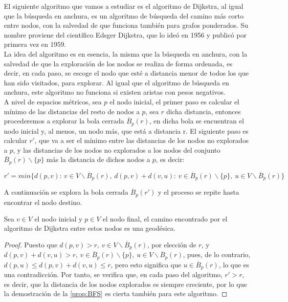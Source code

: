 El siguiente algoritmo que vamos a estudiar es el algoritmo de Dijkstra, al igual que la búsqueda en anchura, es un algoritmo de búsqueda del camino más corto entre nodos, con la salvedad de que funciona también para grafos ponderados. Su nombre proviene del científico Edsger Dijkstra, que lo ideó en 1956 y publicó por primera vez en 1959. \\

La idea del algoritmo es en esencia, la misma que la búsqueda en anchura, con la salvedad de que la exploración de los nodos se realiza de forma ordenada, es decir, en cada paso, se escoge el nodo que esté a distancia menor de todos los que han sido visitados, para explorar. Al igual que el algoritmo de búsqueda en anchura, este algoritmo no funciona si existen aristas con pesos negativos. \\

A nivel de espacios métricos, sea $p$ el nodo inicial, el primer paso es calcular el mínimo de las distancias del resto de nodos a $p$, sea $r$ dicha distancia, entonces procederemos a explorar la bola cerrada $\overline B_p(r)$, en dicha bola se encuentran el nodo inicial y, al menos, un nodo más, que está a distancia r. El siguiente paso es calcular $r'$, que va a ser el mínimo entre las distancias de los nodos no explorados a $p$, y las distancias de los nodos no explorados a los nodos del conjunto $\overline B_p(r)\backslash\{p\}$ más la distancia de dichos nodos a $p$, es decir:

$$r' = min\{d(p,v):\ v \in V\backslash\overline B_p(r),\ d(p,v) + d(v,u):\ v \in \overline B_p(r)\backslash\{p\},\ u \in V\backslash\overline B_p(r)\}$$

A continuación se explora la bola cerrada $\overline B_p(r')$ y el proceso se repite hasta encontrar el nodo destino.

\begin{proposicion}\label{prop:DJK}
	Sea $v \in V$ el nodo inicial y $p \in V$ el nodo final, el camino encontrado por el algoritmo de Dijkstra entre estos nodos es una geodésica.
\end{proposicion}

\begin{proof}
	Puesto que $d(p,v) > r,\ v \in V\backslash\overline B_p(r)$, por elección de $r$, y $d(p,v) + d(v,u) > r,\ v \in \overline B_p(r)\backslash\{p\},\ u \in V\backslash\overline B_p(r)$, pues, de lo contrario, $d(p,u) \leq d(p,v) + d(v,u) \leq r$, pero esto significa que $u \in \overline B_p(r)$, lo que es una contradicción. Por tanto, se verifica que, en cada paso del algoritmo, $r' > r$, es decir, que la distancia de los nodos explorados es siempre creciente, por lo que la demostración de la \autoref{prop:BFS} es cierta también para este algoritmo.
\end{proof}

